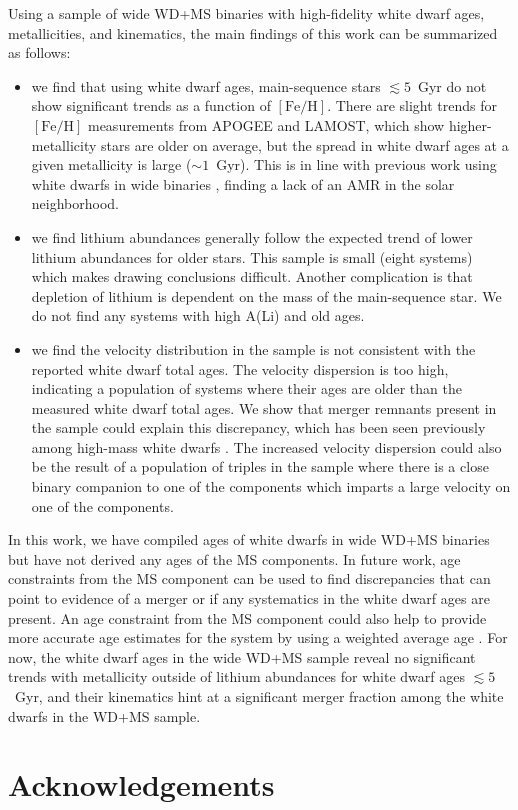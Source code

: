 \documentclass[twocolumn,linenumbers]{aastex631}
\begin{document}
Using a sample of wide WD+MS binaries with high-fidelity white dwarf ages, metallicities, and kinematics, the main findings of this work can be summarized as follows:
\begin{itemize}

\item we find that using white dwarf ages, main-sequence stars $\lesssim 5$~Gyr do not show significant trends as a function of $\left[\mathrm{Fe/H}\right]$. There are slight trends for $\left[\mathrm{Fe/H}\right]$ measurements from APOGEE and LAMOST, which show higher-metallicity stars are older on average, but the spread in white dwarf ages at a given metallicity is large ($\sim 1$~Gyr). This is in line with previous work using white dwarfs in wide binaries \citep{2021MNRAS.505.3165R}, finding a lack of an AMR in the solar neighborhood.

\item we find lithium abundances generally follow the expected trend of lower lithium abundances for older stars. This sample is small (eight systems) which makes drawing conclusions difficult. Another complication is that depletion of lithium is dependent on the mass of the main-sequence star. We do not find any systems with high A(Li) and old ages.

\item we find the velocity distribution in the sample is not consistent with the reported white dwarf total ages. The velocity dispersion is too high, indicating a population of systems where their ages are older than the measured white dwarf total ages. We show that merger remnants present in the sample could explain this discrepancy, which has been seen previously among high-mass white dwarfs \citep{2020ApJ...891..160C}. The increased velocity dispersion could also be the result of a population of triples in the sample where there is a close binary companion to one of the components which imparts a large velocity on one of the components. 

\end{itemize}

In this work, we have compiled ages of white dwarfs in wide WD+MS binaries but have not derived any ages of the MS components. In future work, age constraints from the MS component can be used to find discrepancies that can point to evidence of a merger or if any systematics in the white dwarf ages are present. An age constraint from the MS component could also help to provide more accurate age estimates for the system by using a weighted average age \citep[e.g., ][]{2012ApJ...746..102C}. For now, the white dwarf ages in the wide WD+MS sample reveal no significant trends with metallicity outside of lithium abundances for white dwarf ages $\lesssim 5$~Gyr, and their kinematics hint at a significant merger fraction among the white dwarfs in the WD+MS sample.

\section{Acknowledgements}

{}

\end{document}
